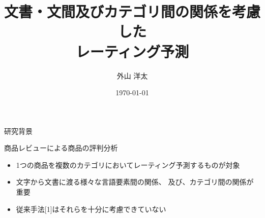\documentclass[aspectratio=43,unicode,10pt]{beamer}
\title{文書・文間及びカテゴリ間の関係を考慮した\\レーティング予測}
\institute{豊田工業大学 知能数理研究室}
\author{外山 洋太}
\date{\today}
\begin{document}
\begin{frame}
\titlepage
\end{frame}

\begin{frame}{研究背景}{}
  \begin{block}{商品レビューによる商品の評判分析}
    \begin{itemize}
      \item 1つの商品を複数のカテゴリにおいてレーティング予測するものが対象
      \item 文字から文書に渡る様々な言語要素間の関係、
            及び、カテゴリ間の関係が重要
      \item 従来手法[1]はそれらを十分に考慮できていない
    \end{itemize}
  \end{block}
\end{frame}
\end{document}
